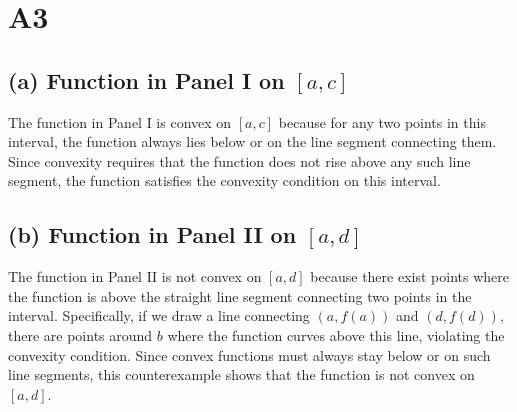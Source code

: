 \documentclass{article}
\begin{document}
\section*{A3}

\subsection*{(a) Function in Panel I on \([a, c]\)}

The function in Panel I is convex on \([a, c]\) because for any two points in this interval, the function always lies below or on the line segment connecting them. Since convexity requires that the function does not rise above any such line segment, the function satisfies the convexity condition on this interval.

\subsection*{(b) Function in Panel II on \([a, d]\)}

The function in Panel II is not convex on \([a, d]\) because there exist points where the function is above the straight line segment connecting two points in the interval. Specifically, if we draw a line connecting \( (a, f(a)) \) and \( (d, f(d)) \), there are points around \( b \) where the function curves above this line, violating the convexity condition. Since convex functions must always stay below or on such line segments, this counterexample shows that the function is not convex on \([a, d]\).
\end{document}
